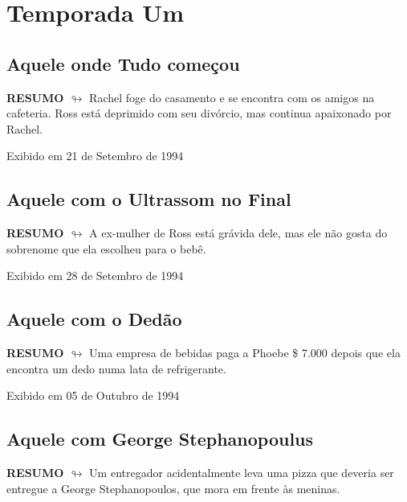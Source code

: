 \part{Temporada Um}

\chapter{Aquele onde Tudo começou}

\textbf{RESUMO $\looparrowright$} Rachel foge do casamento e se encontra com os amigos na cafeteria. Ross está deprimido com seu divórcio, mas continua apaixonado por Rachel.

\begin{flushright}
\textcolor{gray600}{Exibido em 21 de Setembro de 1994}
\end{flushright}


\chapter{Aquele com o Ultrassom no Final}

\textbf{RESUMO $\looparrowright$} A ex-mulher de Ross está grávida dele, mas ele não gosta do sobrenome que ela escolheu para o bebê.

\begin{flushright}
\textcolor{gray600}{Exibido em 28 de Setembro de 1994}
\end{flushright}


\chapter{Aquele com o Dedão}

\textbf{RESUMO $\looparrowright$} Uma empresa de bebidas paga a Phoebe \$ 7.000 depois que ela encontra um dedo numa lata de refrigerante.

\begin{flushright}
\textcolor{gray600}{Exibido em 05 de Outubro de 1994}
\end{flushright}


\chapter{Aquele com George Stephanopoulus}

\textbf{RESUMO $\looparrowright$} Um entregador acidentalmente leva uma pizza que deveria ser entregue a George Stephanopoulos, que mora em frente às meninas.

